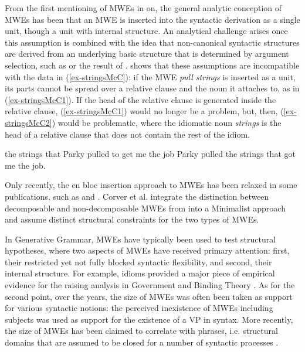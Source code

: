 \documentclass[output=paper]{langsci/langscibook}
\begin{document}
From the first mentioning of MWEs in  \citet{Chomsky:65} on, the general analytic conception of MWEs has been that an MWE is inserted into the syntactic derivation as a single unit, though a unit with internal structure. An analytical challenge arises once this assumption is combined with the idea that non-canonical syntactic structures are derived from an underlying basic structure that is determined by argument selection, such as  or the result of . \citet{McCawley:81} shows that these assumptions are incompatible with the data in (\ref{ex-stringsMcC}): if the MWE \textit{pull strings} is inserted as a unit, its parts cannot be spread over a relative clause and the noun it attaches to, as in (\ref{ex-stringsMcC1}). If the head of the relative clause is generated inside the relative clause, (\ref{ex-stringsMcC1}) would no longer be a problem, but, then, (\ref{ex-stringsMcC2}) would be problematic, where the idiomatic noun \textit{strings} is the head of a relative clause that does not contain the rest of the idiom.

\begin{exe}
\ex \label{ex-stringsMcC} 
\begin{xlist}
\ex \label{ex-stringsMcC1}
the strings that Parky pulled to get me the job \citep[135]{McCawley:81}
\ex \label{ex-stringsMcC2}
Parky pulled the strings that got me the job.  \citep[137]{McCawley:81}
\end{xlist}
\end{exe}

Only recently, the en bloc insertion approach to MWEs has been relaxed in some publications, such as  \citet{Harley:Stone:13} and  \citet{vCraenenbroeck:al:16draft}. Corver et al.   integrate the distinction between decomposable and non-decomposable MWEs from \citet{Nunberg1994}  into a Minimalist approach and assume distinct structural constraints for the two types of MWEs.

In Generative Grammar, MWEs have typically been used to test structural hypotheses, where two aspects of MWEs have received primary attention: first, their restricted yet not fully blocked syntactic flexibility, and second, their internal structure. For example, idioms provided a major piece of empirical evidence for the raising analysis in Government and Binding Theory \citep{Chomsky:86a}. As for the second point, over the years, the size of MWEs was often been taken as support for various syntactic notions: the perceived inexistence of MWEs including subjects was used as support for the existence of a VP in syntax. More recently, the size of MWEs has been claimed to correlate with phrases, i.e. structural domains that are assumed to be closed for a number of syntactic processes \citep{Svenonius:05}.
\end{document}
